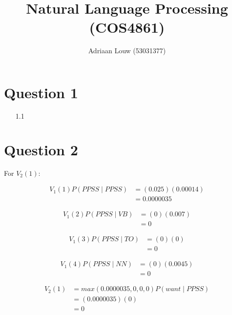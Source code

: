 \documentclass[10pt,a4paper]{article}
\title{Natural Language Processing (COS4861)}
\author{Adriaan Louw (53031377)}
\begin{document}
\maketitle

\section{Question 1}
\begin{enumerate}[leftmargin=\labelsep]
\item[1.1]
\end{enumerate}

\section{Question 2}
For $V_2(1):$

\begin{equation}
\begin{split}
V_1(1)P(PPSS\mid PPSS) &= (0.025)(0.00014) \\
&= 0.0000035
\end{split}
\end{equation}

\begin{equation}
\begin{split}
V_1(2)P(PPSS\mid VB) &= (0)(0.007) \\
 &= 0
\end{split}
\end{equation}

\begin{equation}
\begin{split}
V_1(3)P(PPSS\mid TO) &= (0)(0) \\
&= 0
\end{split}
\end{equation}

\begin{equation}
\begin{split}
V_1(4)P(PPSS\mid NN) &= (0)(0.0045) \\
 &= 0
\end{split}
\end{equation}

\begin{equation}
\begin{split}
V_2(1) &= max(0.0000035,0,0,0)P(want\mid PPSS) \\
 &=(0.0000035)(0) \\
 &=0
\end{split}
\end{equation}
\end{document}
